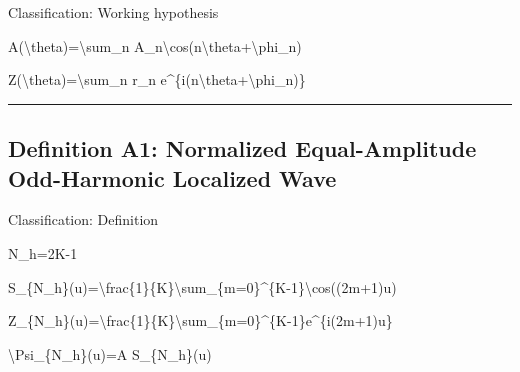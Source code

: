 \documentclass[
  a4paper,
]{article}
\newenvironment{Shaded}{}{}
\newcommand{\NormalTok}[1]{#1}
\begin{document}
Classification: Working hypothesis

\begin{Shaded}
\begin{Highlighting}[]
\NormalTok{A(\textbackslash{}theta)=\textbackslash{}sum\_n A\_n\textbackslash{}cos(n\textbackslash{}theta+\textbackslash{}phi\_n)}
\end{Highlighting}
\end{Shaded}

\begin{Shaded}
\begin{Highlighting}[]
\NormalTok{Z(\textbackslash{}theta)=\textbackslash{}sum\_n r\_n e\^{}\{i(n\textbackslash{}theta+\textbackslash{}phi\_n)\}}
\end{Highlighting}
\end{Shaded}

\begin{center}\rule{0.5\linewidth}{0.5pt}\end{center}

\subsection{Definition A1: Normalized Equal-Amplitude Odd-Harmonic
Localized
Wave}\label{definition-a1-normalized-equal-amplitude-odd-harmonic-localized-wave}

Classification: Definition

\begin{Shaded}
\begin{Highlighting}[]
\NormalTok{N\_h=2K{-}1}
\end{Highlighting}
\end{Shaded}

\begin{Shaded}
\begin{Highlighting}[]
\NormalTok{S\_\{N\_h\}(u)=\textbackslash{}frac\{1\}\{K\}\textbackslash{}sum\_\{m=0\}\^{}\{K{-}1\}\textbackslash{}cos((2m+1)u)}
\end{Highlighting}
\end{Shaded}

\begin{Shaded}
\begin{Highlighting}[]
\NormalTok{Z\_\{N\_h\}(u)=\textbackslash{}frac\{1\}\{K\}\textbackslash{}sum\_\{m=0\}\^{}\{K{-}1\}e\^{}\{i(2m+1)u\}}
\end{Highlighting}
\end{Shaded}

\begin{Shaded}
\begin{Highlighting}[]
\NormalTok{\textbackslash{}Psi\_\{N\_h\}(u)=A S\_\{N\_h\}(u)}
\end{Highlighting}
\end{Shaded}
\end{document}
